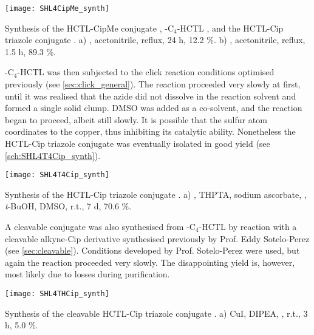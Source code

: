 \begin{scheme}[H]
	\begin{center}
		\texttt{[image: SHL4CipMe\_synth]}
		\caption{
			Synthesis of the HCTL-CipMe conjugate , 
			-C$_4$-HCTL , and
			the HCTL-Cip triazole conjugate .
			a) , acetonitrile, reflux, 24 h, 12.2 \%.
			b) , acetonitrile, reflux, 1.5 h, 89.3 \%.
			\label{sch:SHL4CipMe_synth}}
	\end{center}
\end{scheme}

-C$_4$-HCTL  was then subjected to the click reaction conditions optimised previously (see \ref{sec:click_general}). The reaction proceeded very slowly at first, until it was realised that the azide did not dissolve in the reaction solvent and formed a single solid clump. DMSO was added as a co-solvent, and the reaction began to proceed, albeit still slowly. It is possible that the sulfur atom coordinates to the copper, thus inhibiting its catalytic ability. Nonetheless the HCTL-Cip triazole conjugate  was eventually isolated in good yield (see \ref{sch:SHL4T4Cip_synth}).

\begin{scheme}[H]
	\begin{center}
		\texttt{[image: SHL4T4Cip\_synth]}
		\caption{
			Synthesis of the HCTL-Cip triazole conjugate .
			a) , THPTA, sodium ascorbate, , \textit{t}-BuOH, DMSO, r.t., 7 d, 70.6 \%.
			\label{sch:SHL4T4Cip_synth}}
	\end{center}
\end{scheme}

A cleavable conjugate  was also synthesised from -C$_4$-HCTL  by reaction with a cleavable alkyne-Cip derivative  synthesised previously by Prof. Eddy Sotelo-Perez (see \ref{sec:cleavable}). Conditions developed by Prof. Sotelo-Perez were used, but again the reaction proceeded very slowly. The disappointing yield is, however, most likely due to losses during purification.

\begin{scheme}[H]
	\begin{center}
		\texttt{[image: SHL4THCip\_synth]}
		\caption{
			Synthesis of the cleavable HCTL-Cip triazole conjugate .
			a) CuI, DIPEA, , r.t., 3 h, 5.0 \%.
			\label{sch:SHL4THCip_synth}}
	\end{center}
\end{scheme}